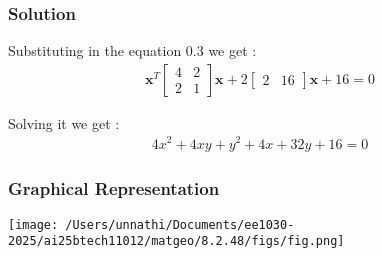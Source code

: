 \documentclass{beamer}
\begin{document}
\begin{frame}
\frametitle{Solution}
Substituting in the equation 0.3 we get :
\begin{align}
  \textbf{x}^{T}\begin{bmatrix}4 & 2\\2 & 1\end{bmatrix}\textbf{x} + 2\begin{bmatrix}2 & 16\end{bmatrix}\textbf{x} +16 =0
\end{align}

Solving it we get :
\begin{align}
 4x^{2} + 4xy + y^{2} + 4x + 32y + 16 = 0
\end{align}
\end{frame}

\begin{frame}


\frametitle{Graphical Representation}
\begin{center}
\texttt{[image: /Users/unnathi/Documents/ee1030-2025/ai25btech11012/matgeo/8.2.48/figs/fig.png]}
\end{center}
\end{frame}
\end{document}
